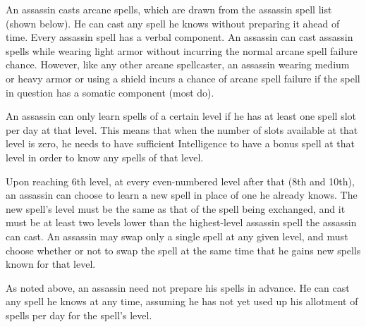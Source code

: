 {An assassin casts arcane spells, which are drawn from the assassin spell list (shown below). He can cast any spell he knows without preparing it ahead of time. Every assassin spell has a verbal component. An assassin can cast assassin spells while wearing light armor without incurring the normal arcane spell failure chance. However, like any other arcane spellcaster, an assassin wearing medium or heavy armor or using a shield incurs a chance of arcane spell failure if the spell in question has a somatic component (most do).


An assassin can only learn spells of a certain level if he has at least one spell slot per day at that level. This means that when the number of slots available at that level is zero, he needs to have sufficient Intelligence to have a bonus spell at that level in order to know any spells of that level.

Upon reaching 6th level, at every even-numbered level after that (8th and 10th), an assassin can choose to learn a new spell in place of one he already knows. The new spell's level must be the same as that of the spell being exchanged, and it must be at least two levels lower than the highest-level assassin spell the assassin can cast. An assassin may swap only a single spell at any given level, and must choose whether or not to swap the spell at the same time that he gains new spells known for that level.

As noted above, an assassin need not prepare his spells in advance. He can cast any spell he knows at any time, assuming he has not yet used up his allotment of spells per day for the spell’s level.

}
